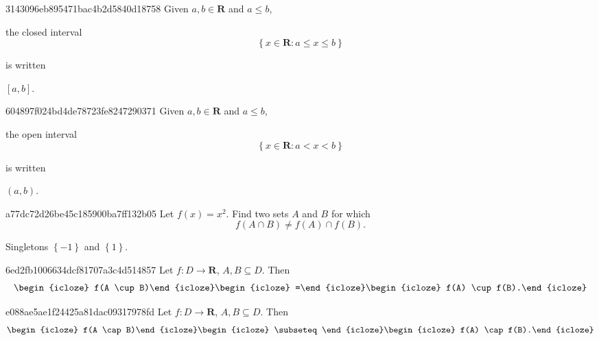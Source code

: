 \begin{note}{3143096eb895471bac4b2d5840d18758}
    Given \({ a, b \in \mathbf{R} }\) and \({ a \leq b }\),
    \begin{icloze}{1}
        the closed interval
        \[
            \left\{ x \in \mathbf{R} : a \leq x \leq b \right\}
        \]
    \end{icloze}
    is written \begin{icloze}{2}\({ [a, b] }\).\end{icloze}
\end{note}

\begin{note}{604897f024bd4de78723fe8247290371}
    Given \({ a, b \in \mathbf{R} }\) and \({ a \leq b }\),
    \begin{icloze}{1}
        the open interval
        \[
            \left\{ x \in \mathbf{R} : a < x < b \right\}
        \]
    \end{icloze}
    is written \begin{icloze}{2}\({ (a, b) }\).\end{icloze}
\end{note}

\begin{note}{a77dc72d26be45c185900ba7ff132b05}
    Let \({ f(x) = x^2 }\). Find two sets \({ A }\) and \({ B }\) for which
    \[
        f(A \cap B) \neq f(A) \cap f(B).
    \]

    \begin{cloze}{1}
        Singletons \({ \left\{ -1 \right\} }\) and \({ \left\{ 1 \right\} }\).
    \end{cloze}
\end{note}

\begin{note}{6ed2fb1006634dcf81707a3c4d514857}
    Let \({ f : D \to \mathbf{R} }\),\: \({ A, B \subseteq D }\).
    Then
    \[
        \begin{icloze}{3}f(A \cup B)\end{icloze} \begin{icloze}{1}=\end{icloze} \begin{icloze}{2}f(A) \cup f(B).\end{icloze}
    \]
\end{note}

\begin{note}{e088ae5ae1f24425a81dac09317978fd}
    Let \({ f : D \to \mathbf{R} }\),\: \({ A, B \subseteq D }\).
    Then
    \[
        \begin{icloze}{3}f(A \cap B)\end{icloze} \begin{icloze}{1}\subseteq\end{icloze} \begin{icloze}{2}f(A) \cap f(B).\end{icloze}
    \]
\end{note}

